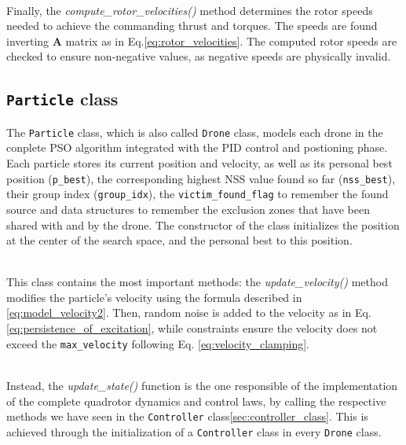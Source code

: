 \noindent\\
Finally, the \textit{compute\_rotor\_velocities()} 
method determines the rotor speeds needed to achieve 
the commanding thrust and torques. The speeds are found 
inverting $\mathbf{A}$ matrix as in Eq.\ref{eq:rotor_velocities}.
The computed rotor speeds are checked 
to ensure non-negative values, as negative speeds are 
physically invalid.

\subsection{\texttt{Particle} class}
The \texttt{Particle} class, which is also called \texttt{Drone} 
class, models each drone in the conplete PSO algorithm integrated with the PID
control and postioning phase. 
\noindent\\
Each particle stores its current 
position and velocity, as well as its personal 
best position (\texttt{p\_best}), the corresponding
highest NSS value found so far (\texttt{nss\_best}), 
their group index (\texttt{group\_idx}), 
the \texttt{victim\_found\_flag} to remember the found source and 
data structures to remember the exclusion zones 
that have been shared with and by the drone.
The constructor of the class initializes the position 
at the center of the search space, and the personal best
to this position.

\noindent\\
This class contains the most important 
methods: the \textit{update\_velocity()} method modifies the 
particle's velocity using the formula described
in \ref{eq:model_velocity2}. Then, random noise is 
added to the velocity as in Eq.\ref{eq:persistence_of_excitation},
while constraints ensure the velocity does not 
exceed the \texttt{max\_velocity} following Eq. \ref{eq:velocity_clamping}.

\noindent\\
Instead, the \textit{update\_state()} function is the one responsible
of the implementation of the complete quadrotor dynamics
and control laws, by calling the respective methods we have seen 
in the \texttt{Controller} class\ref{sec:controller_class}.
This is achieved through the initialization of a \texttt{Controller}
class in every \texttt{Drone} class.

